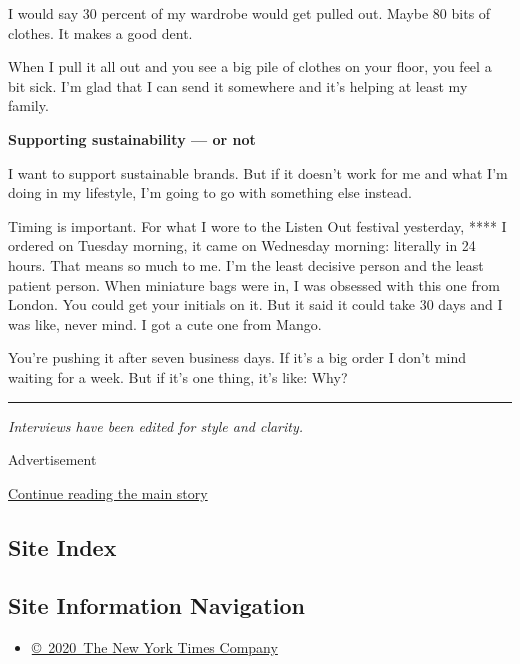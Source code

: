 I would say 30 percent of my wardrobe would get pulled out. Maybe 80
bits of clothes. It makes a good dent.

When I pull it all out and you see a big pile of clothes on your floor,
you feel a bit sick. I'm glad that I can send it somewhere and it's
helping at least my family.

\textbf{Supporting sustainability --- or not}

I want to support sustainable brands. But if it doesn't work for me and
what I'm doing in my lifestyle, I'm going to go with something else
instead.

Timing is important. For what I wore to the Listen Out festival
yesterday, **** I ordered on Tuesday morning, it came on Wednesday
morning: literally in 24 hours. That means so much to me. I'm the least
decisive person and the least patient person. When miniature bags were
in, I was obsessed with this one from London. You could get your
initials on it. But it said it could take 30 days and I was like, never
mind. I got a cute one from Mango.

You're pushing it after seven business days. If it's a big order I don't
mind waiting for a week. But if it's one thing, it's like: Why?

\begin{center}\rule{0.5\linewidth}{\linethickness}\end{center}

\emph{Interviews have been edited for style and clarity.}

Advertisement

\protect\hyperlink{after-bottom}{Continue reading the main story}

\hypertarget{site-index}{%
\subsection{Site Index}\label{site-index}}

\hypertarget{site-information-navigation}{%
\subsection{Site Information
Navigation}\label{site-information-navigation}}

\begin{itemize}
\tightlist
\item
  \href{https://help.nytimes.com/hc/en-us/articles/115014792127-Copyright-notice}{©~2020~The
  New York Times Company}
\end{itemize}

